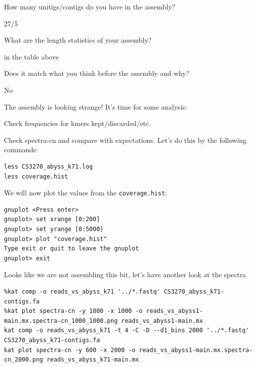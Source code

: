\begin{questions}
How many unitigs/contigs do you have in the assembly?
\begin{answer}
27/5
\end{answer}
What are the length statistics of your assembly?
\begin{answer}
in the table above
\end{answer}
Does it match what you think before the assembly and why?
\begin{answer}
No
\end{answer}

\end{questions}


\begin{steps}
The assembly is looking strange! It's time for some analysis:

\item Check frequencies for kmers kept/discarded/etc.
\item Check spectra-cn and compare with expectations.
Let's do this by the following commands:

\begin{lstlisting}
less CS3270_abyss_k71.log 
less coverage.hist
\end{lstlisting}
\end{steps}

\begin{steps}
We will now plot the values from the \texttt{coverage.hist}:
\begin{lstlisting}
gnuplot <Press enter>
gnuplot> set xrange [0:200]
gnuplot> set yrange [0:5000]
gnuplot> plot "coverage.hist"
Type exit or quit to leave the gnuplot
gnuplot> exit
\end{lstlisting}
\end{steps}


\begin{steps}
Looks like we are not assembling this bit, let's have another look at the spectra
\begin{lstlisting}
%kat comp -o reads_vs_abyss_k71 '../*.fastq' CS3270_abyss_k71-contigs.fa
%kat plot spectra-cn -y 1000 -x 1000 -o reads_vs_abyss1-main.mx.spectra-cn_1000_1000.png reads_vs_abyss1-main.mx
kat comp -o reads_vs_abyss_k71 -t 4 -C -D --d1_bins 2000 '../*.fastq' CS3270_abyss_k71-contigs.fa
kat plot spectra-cn -y 600 -x 2000 -o reads_vs_abyss1-main.mx.spectra-cn_2000.png reads_vs_abyss_k71-main.mx

\end{lstlisting}
\end{steps}

